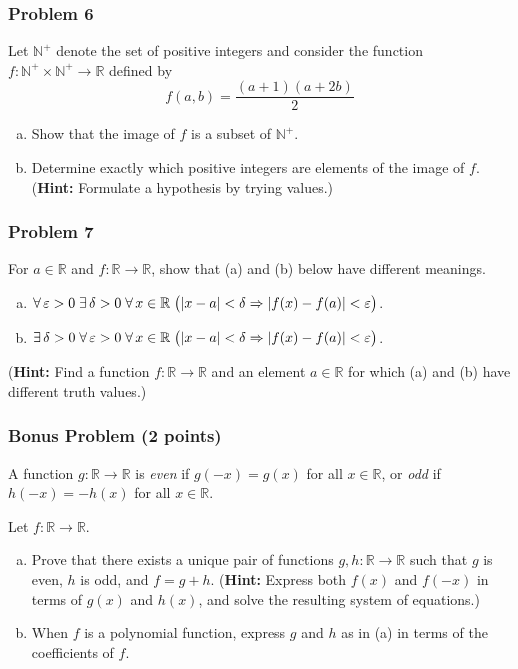 \documentclass[11pt,onecolumn,fleqn]{article}
\theoremstyle{definition}
\DeclarePairedDelimiter\card{|}{|}
\def\fall#1{\forall\, {#1}\;}
\def\fex#1{\exists \,{#1}\;}
\begin{document}
\subsubsection*{Problem 6}
Let $\mathbb{N^{+}}$ denote the set of positive integers and consider
the function $f : \mathbb{N^{+}} \times \mathbb{N^{+}} \to \mathbb{R}$ defined by
$$f(a,b) = \frac{(a+1)(a+2b)}{2}$$
\begin{enumerate}[(a)]
\item Show that the image of $f$ is a subset of $\mathbb{N^{+}}$.
\item Determine exactly which positive integers are elements of the image of $f$. 
(\textbf{Hint:} Formulate a hypothesis by trying values.)
\end{enumerate}

\subsubsection*{Problem 7}
For $a \in \mathbb{R}$ and $f : \mathbb{R} \to \mathbb{R}$, show that (a) and (b) below have different meanings.
\begin{enumerate}[(a)]
\item $\fall{ \varepsilon > 0} \fex{\delta > 0} \fall{x \in \mathbb{R}} 
\bigl( \card{x-a} < \delta \Rightarrow \card{f(x) - f(a)} < \varepsilon \bigr)$.
\item $\fex{\delta > 0} \fall{\varepsilon > 0} \fall{x \in \mathbb{R}} 
\bigl( \card{x-a} < \delta \Rightarrow \card{f(x) - f(a)} < \varepsilon \bigr)$.
\end{enumerate}
(\textbf{Hint:} Find a function $f : \mathbb{R} \to \mathbb{R}$ and an element $a \in \mathbb{R}$ for which 
(a) and (b) have different truth values.)

\subsubsection*{Bonus Problem  (2 points)}
A function $g : \mathbb{R} \to \mathbb{R}$ is \textit{even} if $g(-x) = g(x)$ for all $x \in \mathbb{R}$, 
or \textit{odd} if $h(-x)=-h(x)$ for all $x \in \mathbb{R}$.

Let $f : \mathbb{R} \to \mathbb{R}$.
\begin{enumerate}[(a)] \vspace{-10pt}
\item Prove that there exists a unique pair of functions $g,h : \mathbb{R} \to \mathbb{R}$ such that $g$ is even, 
$h$ is odd, and $f=g+h$. (\textbf{Hint:} Express both $f(x)$ and $f(-x)$ in terms of $g(x)$ and $h(x)$, and solve 
the resulting system of equations.)
\item When $f$ is a polynomial function, express $g$ and $h$ as in (a) in terms of the coefficients of $f$.
\end{enumerate}
\end{document}
